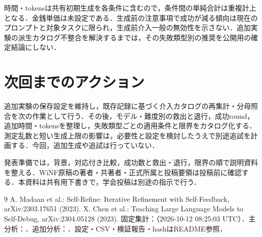 \documentclass[a4paper,8pt,twocolumn]{extarticle}
\begin{document}
時間・tokensは共有初期生成を各条件に含むので，条件間の単純合計は重複計上となる．金銭単価は未設定である．生成前の注意事項で成功が減る傾向は現在のプロンプトと対象タスクに限られ，生成前介入一般の無効性を示さない．追加実験の派生カタログ不整合を解決するまでは，その失敗類型別の推奨を公開用の確定結論にしない．

\section{次回までのアクション}
追加実験の保存設定を維持し，既存記録に基づく介入カタログの再集計・分母照合を次の作業として行う．その後，モデル・難度別の救出と退行，成功round，追加時間・tokensを整理し，失敗類型ごとの適用条件と限界をカタログ化する．測定乱数と短い生成上限の影響は，必要性と設定を検討したうえで別途追試を計画する．今回，追加生成や追試は行っていない．

発表準備では，背景，対応付き比較，成功数と救出・退行，限界の順で説明資料を整える．WiNF原稿の著者・共著者・正式所属と投稿要領は投稿前に確認する．本資料は共有用下書きで，学会投稿は別途の指示で行う．
\begin{thebibliography}{9}
 A. Madaan et al.: Self-Refine: Iterative Refinement with Self-Feedback, arXiv:2303.17651 (2023).
 X. Chen et al.: Teaching Large Language Models to Self-Debug, arXiv:2304.05128 (2023).
 固定集計：（2026-10-12 08:25:03 UTC）．主分析：．追加分析：．設定・CSV・検証報告・hashはREADME参照．
\end{thebibliography}
\end{document}

